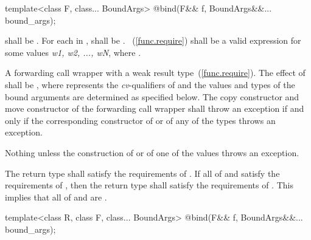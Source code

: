 \begin{itemdecl}
template<class F, class... BoundArgs>
  @\unspec@ bind(F&& f, BoundArgs&&... bound_args);
\end{itemdecl}

\begin{itemdescr}
\pnum
\requires
{} shall be . For each 
in ,  shall be .
~(\ref{func.require}) shall be a valid expression for some
values \textit{w1, w2, ..., wN}, where
.

\pnum\returns A forwarding call wrapper  with a weak result
type~(\ref{func.require}). The effect of  shall
be , where  represents the
\textit{cv}-qualifiers of  and the values and types of the bound
arguments  are determined as specified below.
The copy constructor and move constructor of the forwarding call wrapper shall throw an
exception if and only if the corresponding constructor of  or of any of the types
 throws an exception.

\pnum
\throws Nothing unless the construction of
 or of one of the values  throws an exception.

\pnum
\notes The return type shall satisfy the requirements of . If all
of  and  satisfy the requirements of , then the
return type shall satisfy the requirements of . \enternote This implies
that all of  and  are . \exitnote
\end{itemdescr}

\begin{itemdecl}
template<class R, class F, class... BoundArgs>
  @\unspec@ bind(F&& f, BoundArgs&&... bound_args);
\end{itemdecl}

